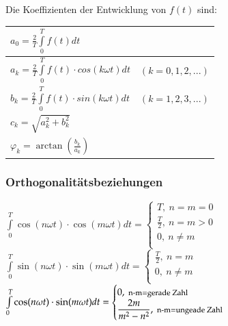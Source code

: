 \begin{minipage}{0.5\linewidth}
    Die Koeffizienten der Entwicklung von $f(t)$ sind: \vfill
    \begin{tabular}{|ll|}
        \hline
        $a_{0} = \frac{2}{T}\int\limits_{0}^{T}f(t)dt$ & \\
        \hline
        $a_{k} = \frac{2}{T}\int\limits_{0}^{T}f(t) \cdot cos(k \omega t)dt$   &
         $(k = 0,1,2,...)$\\
        \hline
        $b_{k} = \frac{2}{T}\int\limits_{0}^{T}f(t) \cdot sin(k \omega t)dt$   &
         $(k = 1,2,3,...)$\\
        \hline
        $c_{k} = \sqrt{a_k^2 + b_k^2}$ &\\
        \hline
        $\varphi_k = \arctan(\frac{b_k}{a_k}) $&\\
        \hline
    \end{tabular}
\end{minipage}
\begin{minipage}{0.5\linewidth}
    \subsubsection{Orthogonalitätsbeziehungen}
    $\int\limits_0^T \cos(n\omega t)\cdot \cos(m\omega t)dt=
    \begin{cases}
    T,\ n=m=0\\
    \frac{T}{2},\ n=m>0\\ 
    0,\ n\neq m\\
    \end{cases}$\\
    
    
    $\int\limits_0^T \sin(n\omega t)\cdot \sin(m\omega t)dt=
    \begin{cases}
    \frac{T}{2},\ n=m\\
    0,\ n\neq m\\
    \end{cases}$\\
    $\int\limits_0^T \cos(n\omega t)\cdot \sin(m\omega t)dt=
    \begin{cases}
    0,\ \text{\footnotesize n-m=gerade Zahl}\\
    \dfrac{2m}{m^2-n^2},\ \text{{\footnotesize n-m=ungeade Zahl}}\\
    \end{cases}$
\end{minipage}

